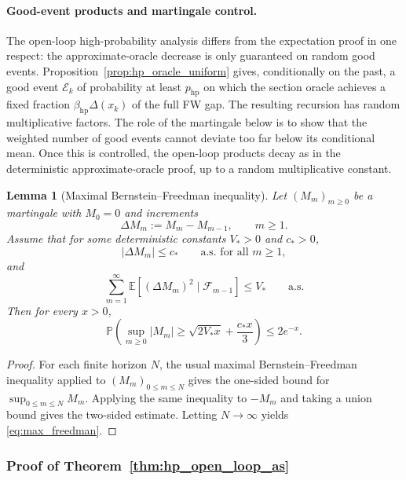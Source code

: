 \documentclass{article}
\newtheorem{lemma}{Lemma}
\begin{document}
\paragraph{Good-event products and martingale control.}
The open-loop high-probability analysis differs from the expectation proof in
one respect: the approximate-oracle decrease is only guaranteed on random
good events. Proposition~\ref{prop:hp_oracle_uniform} gives, conditionally on
the past, a good event \(\mathcal E_k\) of probability at least \(p_{\mathrm{hp}}\)
on which the section oracle achieves a fixed fraction
\(\beta_{\mathrm{hp}}\Delta(x_k)\) of the full FW gap. The resulting recursion
has random multiplicative factors. The role of the martingale below is to show
that the weighted number of good events cannot deviate too far below its
conditional mean. Once this is controlled, the open-loop products decay as in
the deterministic approximate-oracle proof, up to a random multiplicative
constant.


\begin{lemma}[Maximal Bernstein--Freedman inequality]
\label{lem:max_freedman}
Let \((M_m)_{m\ge0}\) be a martingale with \(M_0=0\) and increments
\[
\Delta M_m:=M_m-M_{m-1},
\qquad m\ge1.
\]
Assume that for some deterministic constants \(V_*>0\) and \(c_*>0\),
\[
|\Delta M_m|\le c_*
\qquad\text{a.s. for all }m\ge1,
\]
and
\[
\sum_{m=1}^{\infty}
\mathbb E\!\left[(\Delta M_m)^2\mid\mathcal F_{m-1}\right]
\le V_*
\qquad\text{a.s.}
\]
Then for every \(x>0\),
\begin{equation}
\mathbb P\!\left(
\sup_{m\ge0}|M_m|
\ge
\sqrt{2V_*x}+\frac{c_*x}{3}
\right)
\le 2e^{-x}.
\label{eq:max_freedman}
\end{equation}
\end{lemma}

\begin{proof}
For each finite horizon \(N\), the usual maximal Bernstein--Freedman inequality
applied to \((M_m)_{0\le m\le N}\) gives the one-sided bound for
\(\sup_{0\le m\le N}M_m\). Applying the same inequality to \(-M_m\) and taking
a union bound gives the two-sided estimate. Letting \(N\to\infty\) yields
\eqref{eq:max_freedman}.
\end{proof}

\subsubsection{Proof of Theorem~\ref{thm:hp_open_loop_as}}
\end{document}

